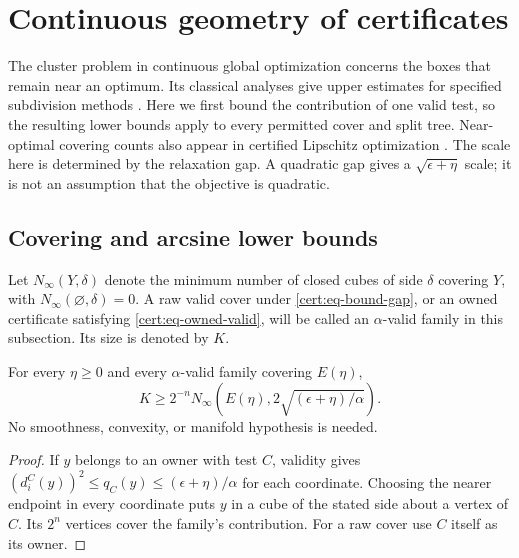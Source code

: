 \section{Continuous geometry of certificates}
\label{sec:geometry}

The cluster problem in continuous global optimization concerns the boxes
that remain near an optimum. Its classical analyses give upper estimates
for specified subdivision methods
\citep{duKearfott1994Cluster,wechsungSchaberBarton2014Cluster,
kannanBarton2017ConstrainedCluster}.
Here we first bound the contribution of one valid test, so the resulting
lower bounds apply to every permitted cover and split tree. Near-optimal
covering counts also appear in certified Lipschitz optimization
\citep{bachocCesariGerchinovitz2021LipschitzCertificates}. The scale here
is determined by the relaxation gap. A quadratic gap gives a
$\sqrt{\epsilon+\eta}$ scale; it is not an assumption that the objective
is quadratic.

\subsection{Covering and arcsine lower bounds}

Let $N_\infty(Y,\delta)$ denote the minimum number of closed cubes of side
$\delta$ covering $Y$, with $N_\infty(\varnothing,\delta)=0$. A raw valid
cover under \cref{cert:eq-bound-gap}, or an owned certificate satisfying
\cref{cert:eq-owned-valid}, will be called an $\alpha$-valid family in
this subsection. Its size is denoted by $K$.

\begin{theorem}\label{geom:thm-cover-lower}
For every $\eta\geq0$ and every $\alpha$-valid family covering $E(\eta)$,
\begin{equation}\label{geom:eq-cover-lower}
 K\geq 2^{-n}N_\infty\!\left(E(\eta),
                         2\sqrt{(\epsilon+\eta)/\alpha}\right).
\end{equation}
No smoothness, convexity, or manifold hypothesis is needed.
\end{theorem}
\begin{proof}
If $y$ belongs to an owner with test $C$, validity gives
$(d_i^C(y))^2\leq q_C(y)\leq(\epsilon+\eta)/\alpha$ for each coordinate.
Choosing the nearer endpoint in every coordinate puts $y$ in a cube of
the stated side about a vertex of $C$. Its $2^n$ vertices cover the
family's contribution. For a raw cover use $C$ itself as its owner.
\end{proof}

